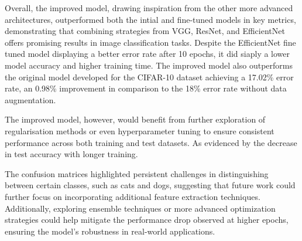 \documentclass[10pt,twocolumn,letterpaper]{article}
\begin{document}
Overall, the improved model, drawing inspiration from the other more advanced architectures, outperformed both the intial and fine-tuned models in key metrics, demonstrating that combining strategies from VGG, ResNet, and EfficientNet offers promising results in image classification tasks. Despite the EfficientNet fine tuned model displaying a better error rate after 10 epochs, it did siaply a lower model accuracy and higher training time. The improved model also outperforms the original model developed for the CIFAR-10 dataset \cite{cifar10} achieving a 17.02\% error rate, an 0.98\% improvement in comparison to the 18\% error rate without data augmentation.

The improved model, however, would benefit from further exploration of regularisation methods or even hyperparameter tuning to ensure consistent performance across both training and test datasets. As evidenced by the decrease in test accuracy with longer training. 

The confusion matrices highlighted persistent challenges in distinguishing between certain classes, such as cats and dogs, suggesting that future work could further focus on incorporating additional feature extraction techniques. Additionally, exploring ensemble techniques or more advanced optimization strategies could help mitigate the performance drop observed at higher epochs, ensuring the model's robustness in real-world applications.



{\small


}
\end{document}
